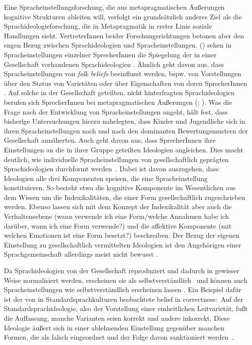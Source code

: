 Eine Spracheinstellungsforschung, die aus metapragmatischen Äußerungen kognitive Strukturen ableiten will, verfolgt ein grundsätzlich anderes Ziel als die Sprachideologieforschung, die in Metapragmatik in erster Linie soziale Handlungen sieht.
VertreterInnen beider Forschungsrichtungen betonen aber den engen Bezug zwischen Sprachideologien und Spracheinstellungen. \citeauthor{Woolard1994} (\citeyear[61--62]{Woolard1994}) sehen in Spracheinstellungen einzelner SprecherInnen die Spiegelung der in einer Gesellschaft vorhandenen Sprachideologien \citep[vgl. auch][161--162]{Milroy2004}. 
Ähnlich geht \citet[xxiv]{Preston.1999b} davon aus, dass Spracheinstellungen von \textit{folk beliefs} beeinflusst werden, bspw. von Vorstellungen {\"u}ber den Status von Variet{\"a}ten oder über Eigenschaften von deren SprecherInnen \citep[ähnlich auch][34]{Garrett.2012}.  
Auf solche in der Gesellschaft geteilten, nicht hinterfragten Sprachideologien berufen sich SprecherInnen bei metapragmatischen Äußerungen (\citealp[s.][1]{Gunthner.2012}; \citealp[vgl. auch][205]{Konig2015}). 
Was die Frage nach der Entwicklung von Spracheinstellungen angeht, h{\"a}lt \citet[732]{Neuland.1993} fest, dass bisherige Untersuchungen hierzu nahelegten, dass Kinder und Jugendliche sich in ihren Spracheinstellungen nach und nach den dominanten Bewertungsmustern der Gesellschaft ann{\"a}herten. 
Auch \citet[399]{Lasagabaster.2005} geht davon aus, dass SprecherInnen ihre Einstellungen an die in ihrer Gruppe geteilten Ideologien angleichen. 
Dies macht deutlich, wie individuelle Spracheinstellungen von gesellschaftlich geprägten Sprachideologien durchformt werden~\citep[s.][732]{Neuland.1993}. 
Dabei ist davon auszugehen, dass Ideologien alle drei Komponenten speisen, die eine Spracheinstellung konstituieren. 
So besteht etwa die kognitive Komponente im Wesentlichen aus dem Wissen um die Indexikalitäten, die einer Form gesellschaftlich zugeschrieben werden. 
Ebenso lassen sich mit dem Konzept der Indexikalität aber auch die Verhaltensebene (wann verwende ich eine Form/welche Annahmen habe ich darüber, wann ich eine Form verwende?) und die affektive Komponente (mit welchen Emotionen ist eine Form besetzt?) beschreiben. 
Der Bezug der eigenen Einstellung zu gesellschaftlich vermittelten Ideologien ist den Angehörigen einer Sprachgemeinschaft allerdings meist nicht bewusst \citep[s.][133]{Milroy.2007}.

Da Sprachideologien von der Gesellschaft reproduziert und dadurch in gewisser Weise normalisiert werden, erscheinen sie als selbstverst{\"a}ndlich~\citep[s.][10]{Blommaert.1999} und können auch Spracheinstellungen wie selbstverst{\"a}ndlich erscheinen lassen \citep[s.][123]{Androutsopoulos.2007}.
Ein Beispiel daf{\"u}r ist der von \citet[134]{Milroy.2007} in Standardsprachkulturen beobachtete {\glqq}belief in correctness{\grqq}:~Auf der Standardsprachideologie, also der Vorstellung einer einheitlichen Leitvariet{\"a}t, fu{\ss}t die Auffassung, manche Varianten seien korrekt und andere inkorrekt. 
Diese Ideologie {\"a}u{\ss}ert sich in einer ablehnenden Einstellung gegenüber manchen Formen, die als {\glqq}falsch{\grqq} eingeordnet und der Folge davon sanktioniert werden~\citep[134]{Milroy.2007}.

